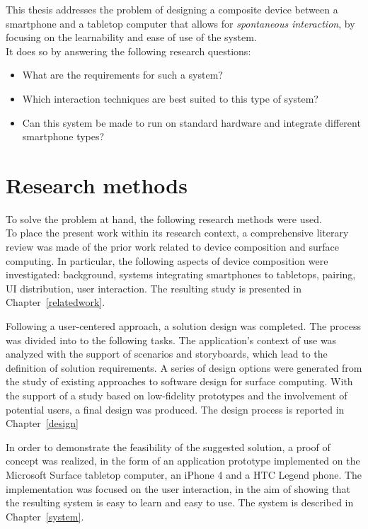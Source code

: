 This thesis addresses the problem of 
designing a composite device between a smartphone and a tabletop computer that allows for \emph{spontaneous interaction}, by focusing on the learnability and ease of use of the system.
\\
\linebreak
It does so by answering the following research questions:
\begin{itemize}
\item What are the requirements for such a system?
\item Which interaction techniques are best suited to this type of system?
\item Can this system be made to run on standard hardware and integrate different smartphone types?
\end{itemize}

\section{Research methods}

To solve the problem at hand, the following research methods were used.
\\
\linebreak
To place the present work within its research context, 
a comprehensive literary review was made of the prior work related to device composition and surface computing.
In particular, the following aspects of device composition were investigated: background, systems integrating smartphones to tabletops, pairing, UI distribution, user interaction.
The resulting study is presented in Chapter~\ref{relatedwork}.

Following a user-centered approach, a solution design was completed.
The process was divided into to the following tasks.
The application's context of use was analyzed with the support of scenarios and storyboards, which lead to the definition of solution requirements.
A series of design options were generated from the study of existing approaches to software design for surface computing.
With the support of a study based on low-fidelity prototypes and the involvement of potential users, a final design was produced.
The design process is reported in Chapter~\ref{design}

In order to demonstrate the feasibility of the suggested solution, a proof of concept was realized, in the form of an application prototype implemented on the Microsoft Surface tabletop computer, an iPhone 4 and a HTC Legend phone.
The implementation was focused on the user interaction, in the aim of showing that the resulting system is easy to learn and easy to use.
The system is described in Chapter~\ref{system}.

